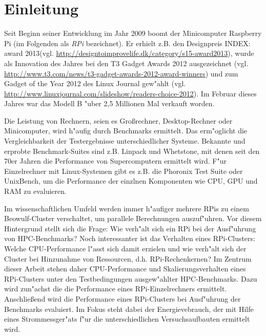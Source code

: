 \chapter{Einleitung}\label{Kap1}

Seit Beginn seiner Entwicklung im Jahr 2009 boomt der Minicomputer Raspberry Pi (im Folgenden als \textit{RPi} bezeichnet). Er erhielt z.B. den Designpreis INDEX: award 2013\newline(vgl. \url{http://designtoimprovelife.dk/category/s15-award2013}), wurde als Innovation des Jahres bei den T3 Gadget Awards 2012 ausgezeichnet (vgl. \url{http://www.t3.com/news/t3-gadget-awards-2012-award-winners}) und zum Gadget of the Year 2012 des Linux Journal gew"ahlt (vgl. \url{http://www.linuxjournal.com/slideshow/readers-choice-2012}). Im Februar dieses Jahres war das Modell B "uber 2,5 Millionen Mal verkauft worden. 

Die Leistung von Rechnern, seien es Gro\ss rechner, Desktop-Rechner oder Minicomputer, wird h"aufig durch Benchmarks ermittelt. Das erm"oglicht die Vergleichbarkeit der Testergebnisse unterschiedlicher Systeme. Bekannte und erprobte Benchmark-Suites sind z.B. Linpack und Whetstone, mit denen seit den 70er Jahren die Performance von Supercomputern ermittelt wird. F"ur Einzelrechner mit Linux-Systemen gibt es z.B. die Phoronix Test Suite oder UnixBench, um die Performance der einzlnen Komponenten wie CPU, GPU und RAM zu evaluieren. 

Im wissenschaftlichen Umfeld werden immer h"aufiger mehrere RPis zu einem Beowulf-Cluster %
verschaltet, um parallele Berechnungen auszuf"uhren. Vor diesem Hintergrund stellt sich die Frage: Wie verh"alt sich ein RPi bei der Ausf"uhrung von HPC-Benchmarks? Noch interessanter ist das Verhalten eines RPi-Clusters: Welche CPU-Performance l"asst sich damit erzielen und wie verh"alt sich der Cluster bei Hinzunahme von Ressourcen, d.h. RPi-Rechenkernen? Im Zentrum dieser Arbeit stehen daher CPU-Performance und Skalierungsverhalten eines RPi-Clusters unter den Testbedingungen ausgew"ahlter HPC-Benchmarks. Dazu wird zun"achst die die Performance eines RPi-Einzelrechners ermittelt. Anschlie\ss end wird die Performance eines RPi-Clusters bei Ausf"uhrung der Benchmarks evaluiert. Im Fokus steht dabei der Energievebrauch, der mit Hilfe eines Strommessger"ats f"ur die unterschiedlichen Versuchsaufbauten ermittelt wird. 

